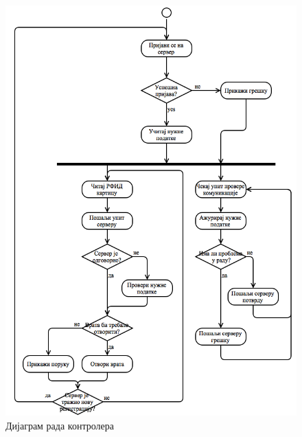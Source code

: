 \documentclass[a4paper, 12pt, diplomski]{etfcyr}
\begin{document}
					\begin{figure}[h]
						\begin{center}
							\includegraphics[scale=0.35]{RoomControllerWorkflow.png}
						\end{center}
						\caption{Дијаграм рада контролера}
						\label{figure:4}
					\end{figure}
\end{document}
